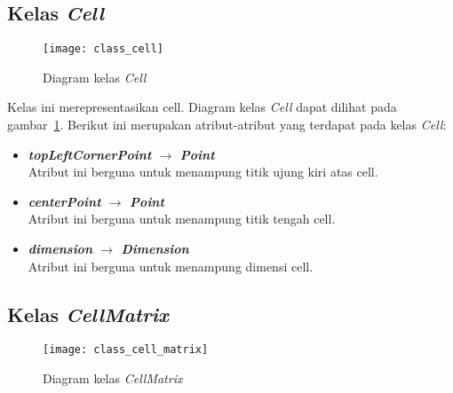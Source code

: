 \subsection{Kelas \textit{Cell}}
\begin{figure}[H]
	\centering  
	\texttt{[image: class\_cell]}
	\caption[Diagram kelas \textit{Cell}]{Diagram kelas \textit{Cell}}
	\label{fig:class_cell}
\end{figure}

Kelas ini merepresentasikan cell. Diagram kelas \textit{Cell} dapat dilihat pada gambar~\ref{fig:class_cell}. Berikut ini merupakan atribut-atribut yang terdapat pada kelas \textit{Cell}:
\begin{itemize}
	\item \textbf{\textit{topLeftCornerPoint} \(\rightarrow\) \textit{Point}}\\
	Atribut ini berguna untuk menampung titik ujung kiri atas cell.
	\item \textbf{\textit{centerPoint} \(\rightarrow\) \textit{Point}}\\
	Atribut ini berguna untuk menampung titik tengah cell.
	\item \textbf{\textit{dimension} \(\rightarrow\) \textit{Dimension}}\\
	Atribut ini berguna untuk menampung dimensi cell.
\end{itemize}

\subsection{Kelas \textit{CellMatrix}}
\begin{figure}[H]
	\centering  
	\texttt{[image: class\_cell\_matrix]}
	\caption[Diagram kelas \textit{CellMatrix}]{Diagram kelas \textit{CellMatrix}}
	\label{fig:class_cell_matrix}
\end{figure}

